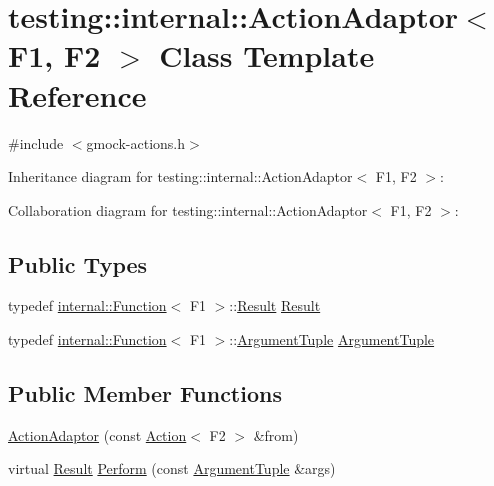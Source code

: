 \hypertarget{classtesting_1_1internal_1_1_action_adaptor}{}\section{testing\+:\+:internal\+:\+:Action\+Adaptor$<$ F1, F2 $>$ Class Template Reference}
\label{classtesting_1_1internal_1_1_action_adaptor}


{\ttfamily \#include $<$gmock-\/actions.\+h$>$}



Inheritance diagram for testing\+:\+:internal\+:\+:Action\+Adaptor$<$ F1, F2 $>$\+:


Collaboration diagram for testing\+:\+:internal\+:\+:Action\+Adaptor$<$ F1, F2 $>$\+:
\subsection*{Public Types}
\begin{DoxyCompactItemize}
\item 
typedef \hyperlink{structtesting_1_1internal_1_1_function}{internal\+::\+Function}$<$ F1 $>$\+::\hyperlink{classtesting_1_1internal_1_1_action_adaptor_afa8f7872b6db3d8f1545fd98b45b0b95}{Result} \hyperlink{classtesting_1_1internal_1_1_action_adaptor_afa8f7872b6db3d8f1545fd98b45b0b95}{Result}
\item 
typedef \hyperlink{structtesting_1_1internal_1_1_function}{internal\+::\+Function}$<$ F1 $>$\+::\hyperlink{classtesting_1_1internal_1_1_action_adaptor_a4f78fb73f97b72fea8a93b78a8ab5704}{Argument\+Tuple} \hyperlink{classtesting_1_1internal_1_1_action_adaptor_a4f78fb73f97b72fea8a93b78a8ab5704}{Argument\+Tuple}
\end{DoxyCompactItemize}
\subsection*{Public Member Functions}
\begin{DoxyCompactItemize}
\item 
\hyperlink{classtesting_1_1internal_1_1_action_adaptor_a24ba3330ef3cc365b956c50ec73e4177}{Action\+Adaptor} (const \hyperlink{classtesting_1_1_action}{Action}$<$ F2 $>$ \&from)
\item 
virtual \hyperlink{classtesting_1_1internal_1_1_action_adaptor_afa8f7872b6db3d8f1545fd98b45b0b95}{Result} \hyperlink{classtesting_1_1internal_1_1_action_adaptor_a8d8a47a31f068cf6e0c95b91605d5540}{Perform} (const \hyperlink{classtesting_1_1internal_1_1_action_adaptor_a4f78fb73f97b72fea8a93b78a8ab5704}{Argument\+Tuple} \&args)
\end{DoxyCompactItemize}


